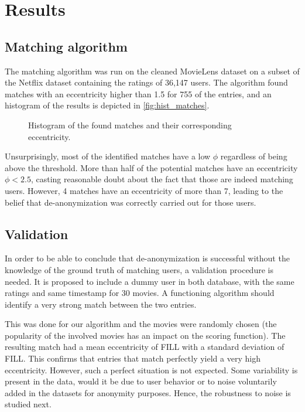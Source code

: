 \section{Results}\label{sec:results}

\subsection{Matching algorithm}

The matching algorithm was run on the cleaned MovieLens dataset on a subset of the Netflix dataset containing the ratings of 36,147 users. The algorithm found matches with an eccentricity higher than 1.5 for 755 of the entries, and an histogram of the results is depicted in \autoref{fig:hist_matches}.

\begin{figure}[h]
	\centering
	
	\caption{Histogram of the found matches and their corresponding eccentricity.}
	\label{fig:hist_matches}
\end{figure}

Unsurprisingly, most of the identified matches have a low $\phi$ regardless of being above the threshold. More than half of the potential matches have an eccentricity $\phi < 2.5$, casting reasonable doubt about the fact that those are indeed matching users. However, 4 matches have an eccentricity of more than 7, leading to the belief that de-anonymization was correctly carried out for those users.

\subsection{Validation}

In order to be able to conclude that de-anonymization is successful without the knowledge of the ground truth of matching users, a validation procedure is needed. It is proposed to include a dummy user in both database, with the same ratings and same timestamp for 30 movies. A functioning algorithm should identify a very strong match between the two entries.

This was done for our algorithm and the movies were randomly chosen (the popularity of the involved movies has an impact on the scoring function). The resulting match had a mean eccentricity of FILL with a standard deviation of FILL. This confirms that entries that match perfectly yield a very high eccentricity. However, such a perfect situation is not expected. Some variability is present in the data, would it be due to user behavior or to noise voluntarily added in the datasets for anonymity purposes. Hence, the robustness to noise is studied next.  

